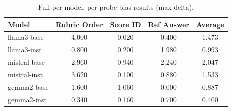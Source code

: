 \begin{table}[h]
\centering\small
\caption{Full per-model, per-probe bias results (max delta).}
\label{tab:full}
\begin{tabular}{lcccc}
\toprule
Model & Rubric Order & Score ID & Ref Answer & Average \\
\midrule
llama3-base & 4.000 & 0.020 & 0.400 & 1.473 \\
llama3-inst & 0.800 & 0.200 & 1.980 & 0.993 \\
mistral-base & 2.960 & 0.940 & 2.240 & 2.047 \\
mistral-inst & 3.620 & 0.100 & 0.880 & 1.533 \\
gemma2-base & 1.600 & 1.060 & 0.000 & 0.887 \\
gemma2-inst & 0.340 & 0.160 & 0.700 & 0.400 \\
\bottomrule
\end{tabular}
\end{table}
